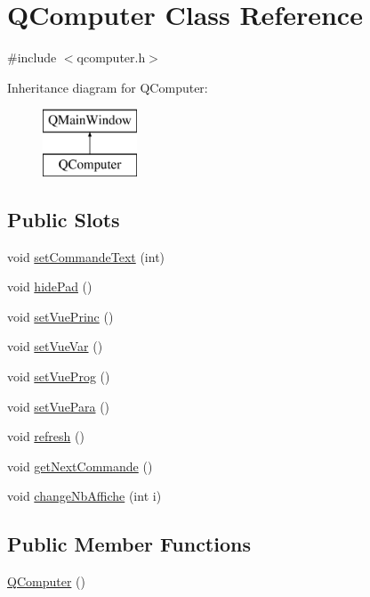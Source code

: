\hypertarget{class_q_computer}{}\section{Q\+Computer Class Reference}
\label{class_q_computer}


{\ttfamily \#include $<$qcomputer.\+h$>$}

Inheritance diagram for Q\+Computer\+:\begin{figure}[H]
\begin{center}
\leavevmode
\includegraphics[height=2.000000cm]{class_q_computer}
\end{center}
\end{figure}
\subsection*{Public Slots}
\begin{DoxyCompactItemize}
\item 
void \hyperlink{class_q_computer_a339f15af348bea2f63de6c13f901cad0}{set\+Commande\+Text} (int)
\item 
void \hyperlink{class_q_computer_af2c6d6f7b77d7c0ab81142be9dfbcbf9}{hide\+Pad} ()
\item 
void \hyperlink{class_q_computer_ad34042fec6ad77bcb4e04cbe91d9f142}{set\+Vue\+Princ} ()
\item 
void \hyperlink{class_q_computer_aa9a8f8fcb2e3cbf97e65cae999008717}{set\+Vue\+Var} ()
\item 
void \hyperlink{class_q_computer_a673fe723a5b084ac64a37ecfec48ce8d}{set\+Vue\+Prog} ()
\item 
void \hyperlink{class_q_computer_a6c5f9ef37c68f5a838477be938678267}{set\+Vue\+Para} ()
\item 
void \hyperlink{class_q_computer_a511996271d43631e5296f62becc2962a}{refresh} ()
\item 
void \hyperlink{class_q_computer_ac32346fc787c1b6fea066f26c9a24e69}{get\+Next\+Commande} ()
\item 
void \hyperlink{class_q_computer_ad9bf4a695778d8b75f88efdfcd0b0fb5}{change\+Nb\+Affiche} (int i)
\end{DoxyCompactItemize}
\subsection*{Public Member Functions}
\begin{DoxyCompactItemize}
\item 
\hyperlink{class_q_computer_a7fa8436da6018cb05e87391503b96d6a}{Q\+Computer} ()
\end{DoxyCompactItemize}


